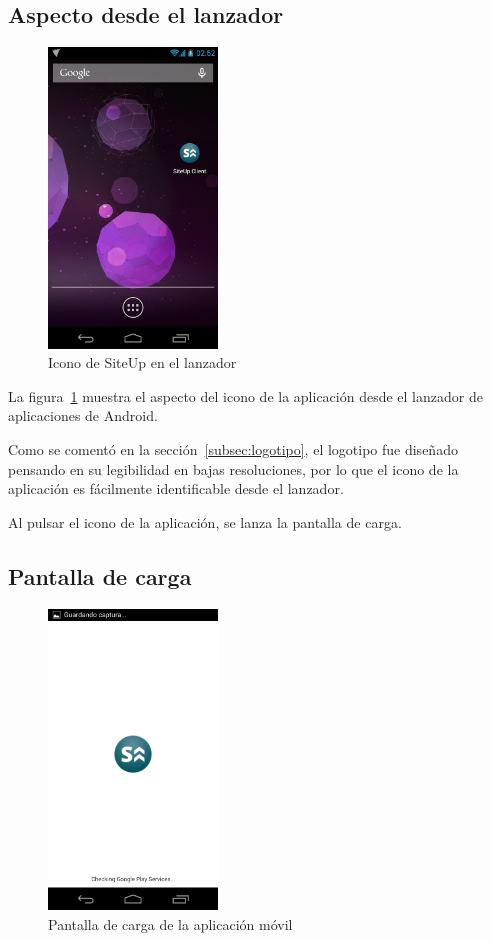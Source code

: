 \subsection{Aspecto desde el lanzador}

\begin{figure}[htbp]
  \centering
  \includegraphics[width=0.4\textwidth]{5_diseno/android-1}
  \caption{Icono de SiteUp en el lanzador}
  \label{fig:android-launcher}
\end{figure}

La figura~\ref{fig:android-launcher} muestra el aspecto del icono de la aplicación
desde el lanzador de aplicaciones de Android. 

Como se comentó en la sección~\ref{subsec:logotipo}, el logotipo fue diseñado
pensando en su legibilidad en bajas resoluciones, por lo que el icono de la
aplicación es fácilmente identificable desde el lanzador.

Al pulsar el icono de la aplicación, se lanza la pantalla de carga.

\subsection{Pantalla de carga}

\begin{figure}[htbp]
  \centering
  \includegraphics[width=0.4\textwidth]{5_diseno/android-2}
  \caption{Pantalla de carga de la aplicación móvil}
  \label{fig:android-loading}
\end{figure}

